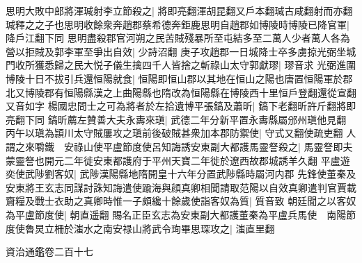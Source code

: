 思明大敗中郎將渾瑊射李立節殺之|{
	將即亮翻渾胡昆翻又戶本翻瑊古咸翻射而亦翻}
瑊釋之之子也思明收餘衆奔趙郡蔡希德奔鉅鹿思明自趙郡如博陵時博陵已降官軍|{
	降戶江翻下同}
思明盡殺郡官河朔之民苦賊殘暴所至屯結多至二萬人少者萬人各為營以拒賊及郭李軍至爭出自效|{
	少詩沼翻}
庚子攻趙郡一日城降士卒多虜掠光弼坐城門收所獲悉歸之民大悦子儀生擒四千人皆捨之斬祿山太守郭獻璆|{
	璆音求}
光弼進圍博陵十日不拔引兵還恒陽就食|{
	恒陽即恒山郡以其地在恒山之陽也唐置恒陽軍於郡北又博陵郡有恒陽縣漢之上曲陽縣也隋改為恒陽縣在博陵西十里恒戶登翻還從宣翻又音如字}
楊國忠問士之可為將者於左拾遺博平張鎬及蕭昕|{
	鎬下老翻昕許斤翻將即亮翻下同}
鎬昕薦左贊善大夫永夀來瑱|{
	武德二年分新平置永夀縣屬邠州瑱他見翻}
丙午以瑱為頴川太守賊屢攻之瑱前後破賊甚衆加本郡防禦使|{
	守式又翻使疏吏翻}
人謂之來嚼鐵　安祿山使平盧節度使呂知誨誘安東副大都護馬靈詧殺之|{
	馬靈詧即夫蒙靈詧也開元二年徙安東都護府于平州天寶二年徙於遼西故郡城誘羊久翻}
平盧遊奕使武陟劉客奴|{
	武陟漢陽縣地隋開皇十六年分置武陟縣時屬河内郡}
先鋒使董秦及安東將王玄志同謀討誅知誨遣使踰海與顔真卿相聞請取范陽以自效真卿遣判官賈載齎糧及戰士衣助之真卿時惟一子頗纔十餘歲使詣客奴為質|{
	質音致}
朝廷聞之以客奴為平盧節度使|{
	朝直遥翻}
賜名正臣玄志為安東副大都護董秦為平盧兵馬使　南陽節度使魯炅立柵於滍水之南安禄山將武令珣畢思琛攻之|{
	滍直里翻}


資治通鑑卷二百十七
